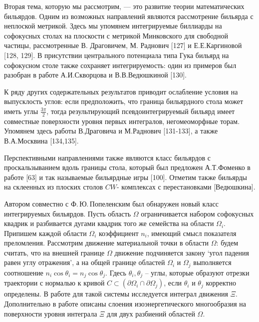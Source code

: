 Вторая тема, которую мы рассмотрим, --- это развитие теории математических бильярдов.
Одним из возможных направлений являются рассмотрение бильярда с неплоской метрикой. Здесь мы упомянем интегрируемые биллиарды на софокусных столах на плоскости с метрикой Минковского для свободной частицы, рассмотренные В. Драговичем, М. Раднович [127] и Е.Е.Каргиновой [128, 129]. В присутствии центрального потенциала типа Гука бильярд на софокусном столе также сохраняет интегрируемость: один из примеров был разобран в работе А.И.Скворцова и В.В.Ведюшкиной [130].

К ряду других содержательных результатов приводит ослабление условия на выпусклость углов: если предположить, что граница бильярдного стола может иметь углы $\frac{3\pi}{2}$, тогда результирующий псевдоинтегрируемый бильярд имеет совместные поверхности уровня первых интегралов, негомеоморфные торам. Упомянем здесь работы В.Драговича и М.Раднович [131-133], а также В.А.Москвина [134,135]. 

Перспективными направлениями также являются класс бильярдов с проскальзыванием вдоль границы стола, который был предложен А.Т.Фоменко в работе [63] и так называемые бильярдные игры [100]. Отметим также бильярды на склеенных из плоских столов $CW$- комплексах с перестановками [Ведюшкина].

Автором совместно с Ф.\,Ю.\,Попеленским был обнаружен новый класс интегрируемых бильярдов.
Пусть область $\Omega$ ограничивается набором софокусных квадрик и разбивается дугами квадрик того же семейства на области $\Omega_i$. Припишем каждой области $\Omega_i$ коэффициент $n_i$, имеющий смысл показателя преломления.
Рассмотрим движение материальной точки в области $\Omega$: будем считать, что на внешней границе $\Omega$ движение подчиняется закону `угол падения равен углу отражения', а на общей границе областей $\Omega_i$ и $\Omega_j$ выполняется соотношение $n_i \cos \theta_i = n_j \cos \theta_j$. Гдесь $\theta_i, \theta_j$ -- углы, которые образуют отрезки траектории с нормалью к кривой $C \subset (\partial \Omega_i \cap \partial \Omega_j)$, если $\theta_i$ и $\theta_j$ корректно определены. В работе для такой системы исследуется интеграл движения $\Xi$. Дополнительно в работе описаны слоения изоэнергетического многообразия на поверхности уровня интеграла $\Xi$ для двух разбиений областей $\Omega$. 

